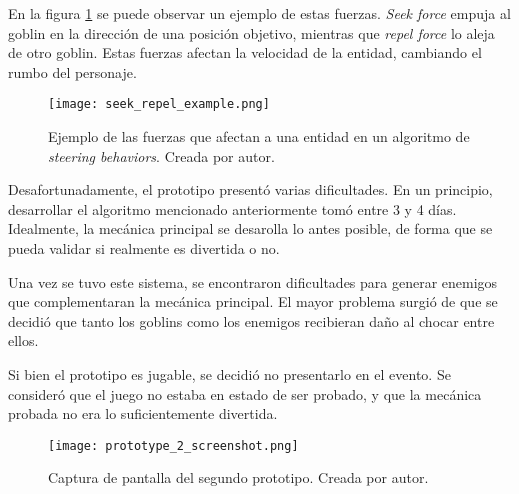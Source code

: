 \par En la figura \ref{fig:x seek repel forces} se puede observar un ejemplo de estas fuerzas. \textit{Seek force} empuja al goblin en la dirección de una posición objetivo, mientras que \textit{repel force} lo aleja de otro goblin. Estas fuerzas afectan la velocidad de la entidad, cambiando el rumbo del personaje.
%
\begin{figure}[H]
  \centering
  \texttt{[image: seek\_repel\_example.png]}
  \caption{Ejemplo de las fuerzas que afectan a una entidad en un algoritmo de \textit{steering behaviors}. Creada por autor.}
  \label{fig:x seek repel forces} 
\end{figure}
%
\bigbreak
\par Desafortunadamente, el prototipo presentó varias dificultades. En un principio, desarrollar el algoritmo mencionado anteriormente tomó entre 3 y 4 días. Idealmente, la mecánica principal se desarolla lo antes posible, de forma que se pueda validar si realmente es divertida o no. 
\par Una vez se tuvo este sistema, se encontraron dificultades para generar enemigos que complementaran la mecánica principal. El mayor problema surgió de que se decidió que tanto los goblins como los enemigos recibieran daño al chocar entre ellos.
\par Si bien el prototipo es jugable, se decidió no presentarlo en el evento. Se consideró que el juego no estaba en estado de ser probado, y que la mecánica probada no era lo suficientemente divertida.
%
\begin{figure}[H]
  \centering
  \texttt{[image: prototype\_2\_screenshot.png]}
  \caption{Captura de pantalla del segundo prototipo. Creada por autor.}
  \label{fig:x prototipo 2 godot} 
\end{figure}
%